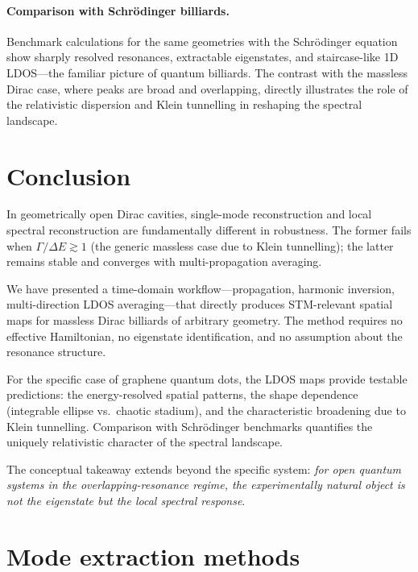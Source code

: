 \documentclass[11pt,a4paper]{article}
\begin{document}
\paragraph{Comparison with Schr\"odinger billiards.}
Benchmark calculations for the same geometries with the Schr\"odinger
equation show sharply resolved resonances, extractable eigenstates,
and staircase-like 1D LDOS---the familiar picture of quantum billiards.
The contrast with the massless Dirac case, where peaks are broad and
overlapping, directly illustrates the role of the relativistic
dispersion and Klein tunnelling in reshaping the spectral landscape.

\section{Conclusion}
\label{sec:conclusion}

In geometrically open Dirac cavities, single-mode reconstruction
and local spectral reconstruction are fundamentally different in
robustness.  The former fails when $\Gamma/\Delta E \gtrsim 1$
(the generic massless case due to Klein tunnelling); the latter
remains stable and converges with multi-propagation averaging.

We have presented a time-domain workflow---propagation, harmonic
inversion, multi-direction LDOS averaging---that directly produces
STM-relevant spatial maps for massless Dirac billiards of arbitrary
geometry.  The method requires no effective Hamiltonian, no eigenstate
identification, and no assumption about the resonance structure.

For the specific case of graphene quantum dots, the LDOS maps
provide testable predictions: the energy-resolved spatial patterns,
the shape dependence (integrable ellipse vs.\ chaotic stadium), and
the characteristic broadening due to Klein tunnelling.  Comparison
with Schr\"odinger benchmarks quantifies the uniquely relativistic
character of the spectral landscape.

The conceptual takeaway extends beyond the specific system:
\emph{for open quantum systems in the overlapping-resonance regime,
the experimentally natural object is not the eigenstate but the
local spectral response}.

\appendix
\section{Mode extraction methods}
\label{app:methods}
\end{document}
